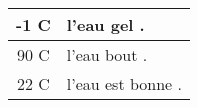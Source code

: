 \begin{tabular}{|c<{\degres C}|>{l'eau }l<{.}|}
\hline
-1 & gel \\ \hline
90 & bout \\ \hline
22 & est bonne \\ \hline
\end{tabular}
